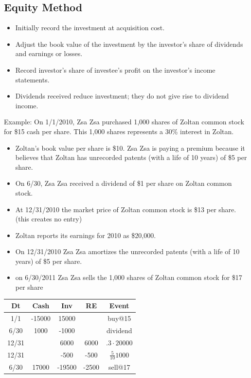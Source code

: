 \subsection*{Equity Method}

\begin{itemize}[noitemsep,topsep=0pt]
	\item Initially record the investment at acquisition cost.
	\item Adjust the book value of the investment by the investor’s share of dividends and
	earnings or losses.
	\item Record investor’s share of investee’s profit on the investor’s income statements.
	\item Dividends received reduce investment; they do not give rise to dividend income.
\end{itemize}

Example: On 1/1/2010, Zsa Zsa purchased 1,000 shares of Zoltan common stock for \$15
cash per share. This 1,000 shares represents a 30\% interest in Zoltan.
\begin{itemize}[noitemsep,topsep=0pt]
	\item Zoltan’s book value per share is \$10. Zsa Zsa is paying a premium because it believes
	that Zoltan has unrecorded patents (with a life of 10 years) of \$5 per share.
	\item On 6/30, Zsa Zsa received a dividend of \$1 per share on Zoltan common stock.
	\item At 12/31/2010 the market price of Zoltan common stock is \$13 per share. (this creates no entry)
	\item Zoltan reports its earnings for 2010 as \$20,000.
	\item On 12/31/2010 Zsa Zsa amortizes the unrecorded patents (with a life of 10 years) of \$5 per share.
	\item on 6/30/2011 Zsa Zsa sells the 1,000 shares of Zoltan common stock for \$17 per share
	
\end{itemize} 


\begin{tabular}{ |c|c|c||c||c| } 
	\hline
	Dt &  Cash & Inv & RE & Event	 \\ 
	\hline
	1/1   & -15000 & 15000 & & buy@15\\
	6/30  & 1000    & -1000 & & dividend \\
	12/31 &         & 6000  & 6000 & $.3 \cdot 20000$\\ 
	12/31 &         & -500  & -500 & $\frac{5}{10}  1000$ \\    
	6/30 &   17000      & -19500  & -2500 & sell@17 \\      	
	\hline
\end{tabular}






